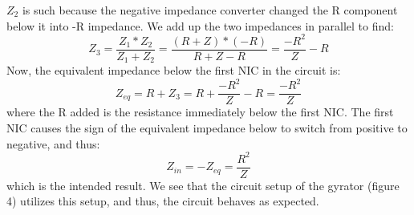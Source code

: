 \documentclass{article}
\begin{document}
    $Z_2$ is such because the negative impedance converter changed the R component below it into -R impedance. We add up the two impedances in parallel to find:
    \begin{equation}
        Z_3 = \frac{Z_1 * Z_2}{Z_1 + Z_2} = \frac{(R+Z)*(-R)}{R+Z-R} = \frac{-R^{2}}{Z} - R
    \end{equation}
    Now, the equivalent impedance below the first NIC in the circuit is:
    \begin{equation}
        Z_{eq} = R + Z_3 = R + \frac{-R^{2}}{Z} - R = \frac{-R^{2}}{Z}
    \end{equation}
    where the R added is the resistance immediately below the first NIC. The first NIC causes the sign of the equivalent impedance below to switch from positive to negative, and thus:
    \begin{equation}
        Z_{in} = -Z_{eq} = \frac{R^{2}}{Z}
    \end{equation}
    which is the intended result. We see that the circuit setup of the gyrator (figure 4) utilizes this setup, and thus, the circuit behaves as expected.
\end{document}
